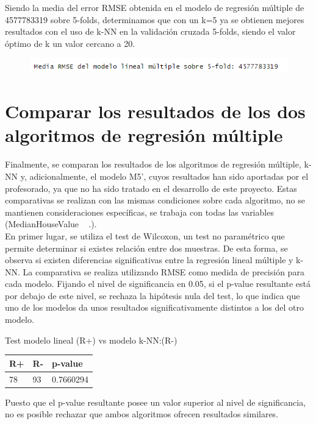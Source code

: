 Siendo la media del error RMSE obtenida en el modelo de regresión múltiple de 4577783319 sobre 5-folds, determinamos que con un k=5 ya se obtienen mejores resultados con el uso de k-NN en la validación cruzada 5-folds, siendo el valor óptimo de k un valor cercano a 20.
\begin{figure}[!h]
	\centering
	\includegraphics[width=1.2\linewidth]{figures/media}
	\caption{}
	\label{fig:media}
\end{figure}




\newpage
\section{Comparar los resultados de los dos algoritmos de regresión múltiple}
Finalmente, se comparan los resultados de los algoritmos de regresión múltiple, k-NN y, adicionalmente, el modelo M5', cuyos resultados han sido aportadas por el profesorado, ya que no ha sido tratado en el desarrollo de este proyecto.
Estas comparativas se realizan con las mismas condiciones sobre cada algoritmo, no se mantienen consideraciones específicas, se trabaja con todas las variables (MedianHouseValue ~ .).\\

En primer lugar, se utiliza el test de Wilcoxon, un test no paramétrico que permite determinar si existes relación entre dos muestras. De esta forma, se observa si existen diferencias significativas entre la regresión lineal múltiple y k-NN. La comparativa se realiza utilizando RMSE como medida de precisión para cada modelo.
Fijando el nivel de significancia en 0.05, si el p-value resultante está por debajo de este nivel, se rechaza la hipótesis nula del test, lo que indica que uno de los modelos da unos resultados significativamente distintos a los del otro modelo.

Test modelo lineal (R+) vs modelo k-NN:(R-)
\begin{table}[!h]
	\centering
	\begin{tabular}{lll}
		R+ & R- & p-value   \\ \hline
		78 & 93 & 0.7660294
	\end{tabular}
\end{table}


Puesto que el p-value resultante posee un valor superior al nivel de significancia, no es posible rechazar que ambos algoritmos ofrecen resultados similares.\\

